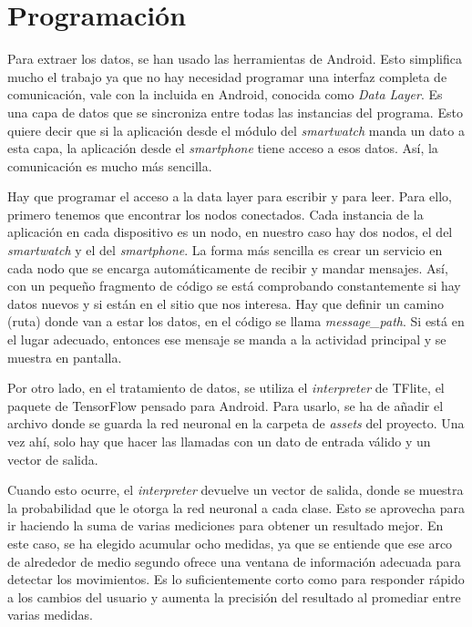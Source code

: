 \documentclass[12pt]{book}
\numberwithin{equation}{section}
\begin{document}
\section{Programación}

Para extraer los datos, se han usado las herramientas de Android. Esto simplifica mucho el trabajo ya que no hay necesidad programar una interfaz completa de comunicación, vale con la incluida en Android, conocida como \textit{Data Layer}. Es una capa de datos que se sincroniza entre todas las instancias del programa. Esto quiere decir que si la aplicación desde el módulo del \textit{smartwatch} manda un dato a esta capa, la aplicación desde el \textit{smartphone} tiene acceso a esos datos. Así, la comunicación es mucho más sencilla.

Hay que programar el acceso a la data layer para escribir y para leer. Para ello, primero tenemos que encontrar los nodos conectados. Cada instancia de la aplicación en cada dispositivo es un nodo, en nuestro caso hay dos nodos, el del \textit{smartwatch} y el del \textit{smartphone}. La forma más sencilla es crear un servicio en cada nodo que se encarga automáticamente de recibir y mandar mensajes. Así, con un pequeño fragmento de código se está comprobando constantemente si hay datos nuevos y si están en el sitio que nos interesa. Hay que definir un camino (ruta) donde van a estar los datos, en el código se llama \textit{message\_path}. Si está en el lugar adecuado, entonces ese mensaje se manda a la actividad principal y se muestra en pantalla.

Por otro lado, en el tratamiento de datos, se utiliza el \textit{interpreter} de TFlite, el paquete de TensorFlow pensado para Android. Para usarlo, se ha de añadir el archivo donde se guarda la red neuronal en la carpeta de \textit{assets} del proyecto. Una vez ahí, solo hay que hacer las llamadas con un dato de entrada válido y un vector de salida.

Cuando esto ocurre, el \textit{interpreter} devuelve un vector de salida, donde se muestra la probabilidad que le otorga la red neuronal a cada clase. Esto se aprovecha para ir haciendo la suma de varias mediciones para obtener un resultado mejor. En este caso, se ha elegido acumular ocho medidas, ya que se entiende que ese arco de alrededor de medio segundo ofrece una ventana de información adecuada para detectar los movimientos. Es lo suficientemente corto como para responder rápido a los cambios del usuario y aumenta la precisión del resultado al promediar entre varias medidas.
\end{document}
